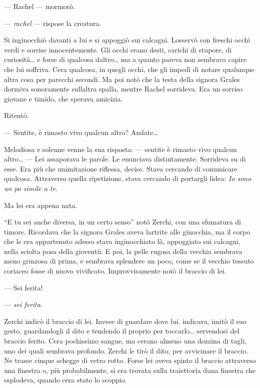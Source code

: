 --- Rachel --- mormorò.

--- \emph{rachel} --- rispose la creatura.

Si inginocchiò davanti a lui e si appoggiò sui calcagni.
L\textquotesingle osservò con freschi occhi verdi e sorrise
innocentemente. Gli occhi erano desti, carichi di stupore, di
curiosità\ldots{} e forse di qualcosa d\textquotesingle altro\ldots{} ma
a quanto pareva non sembrava capire che lui soffriva.
C\textquotesingle era qualcosa, in quegli occhi, che gli impedì di
notare qualunque altra cosa per parecchi secondi. Ma poi notò che la
testa della signora Grales dormiva sonoramente
sull\textquotesingle altra spalla, mentre Rachel sorrideva. Era un
sorriso giovane e timido, che sperava amicizia.

Ritentò.

--- Sentite, è rimasto vivo qualcun altro? Andate\ldots{}

Melodiosa e solenne venne la sua risposta: --- sentite è rimasto vivo
qualcun altro\ldots{} --- Lei assaporava le parole. Le enunciava
distintamente. Sorrideva su di esse. Era più che
un\textquotesingle imitazione riflessa, decise. Stava cercando di
comunicare qualcosa. Attraverso quella ripetizione, stava cercando di
portargli l\textquotesingle idea: \emph{Io sono un po\textquotesingle{}
	simile a te.}

Ma lei era appena nata.

``E tu sei anche diversa, in un certo senso'' notò Zerchi, con una
sfumatura di timore. Ricordava che la signora Grales aveva
l\textquotesingle artrite alle ginocchia, ma il corpo che le era
appartenuto adesso stava inginocchiato là, appoggiato sui calcagni,
nella sciolta posa della gioventù. E poi, la pelle rugosa della vecchia
sembrava meno grinzosa di prima, e sembrava splendere un poco, come se
il vecchio tessuto coriaceo fosse di nuovo vivificato. Improvvisamente
notò il braccio di lei.

--- Sei ferita!

--- \emph{sei ferita.}

Zerchi indicò il braccio di lei. Invece di guardare dove lui. indicava,
imitò il suo gesto, guardandogli il dito e tendendo il proprio per
toccarlo\ldots{} servendosi del braccio ferito. C\textquotesingle era
pochissimo sangue, ma c\textquotesingle erano almeno una dozzina di
tagli, uno dei quali sembrava profondo. Zerchi le tirò il dito, per
avvicinare il braccio. Ne trasse cinque schegge di vetro rotto. Forse
lei aveva spinto il braccio attraverso una finestra o, più
probabilmente, si era trovata sulla traiettoria d\textquotesingle una
finestra che esplodeva, quando c\textquotesingle era stato lo scoppio.

